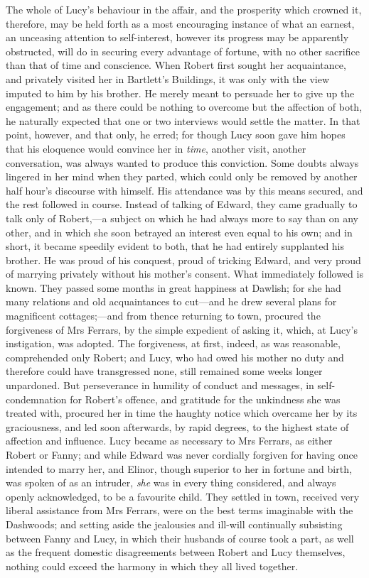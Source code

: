 The whole of Lucy's behaviour in the affair, and the prosperity which crowned it, therefore, may be held forth as a most encouraging instance of what an earnest, an unceasing attention to self-interest, however its progress may be apparently obstructed, will do in securing every advantage of fortune, with no other sacrifice than that of time and conscience. When Robert first sought her acquaintance, and privately visited her in Bartlett's Buildings, it was only with the view imputed to him by his brother. He merely meant to persuade her to give up the engagement; and as there could be nothing to overcome but the affection of both, he naturally expected that one or two interviews would settle the matter. In that point, however, and that only, he erred; for though Lucy soon gave him hopes that his eloquence would convince her in \textit{time}, another visit, another conversation, was always wanted to produce this conviction. Some doubts always lingered in her mind when they parted, which could only be removed by another half hour's discourse with himself. His attendance was by this means secured, and the rest followed in course. Instead of talking of Edward, they came gradually to talk only of Robert,—a subject on which he had always more to say than on any other, and in which she soon betrayed an interest even equal to his own; and in short, it became speedily evident to both, that he had entirely supplanted his brother. He was proud of his conquest, proud of tricking Edward, and very proud of marrying privately without his mother's consent. What immediately followed is known. They passed some months in great happiness at Dawlish; for she had many relations and old acquaintances to cut—and he drew several plans for magnificent cottages;—and from thence returning to town, procured the forgiveness of Mrs Ferrars, by the simple expedient of asking it, which, at Lucy's instigation, was adopted. The forgiveness, at first, indeed, as was reasonable, comprehended only Robert; and Lucy, who had owed his mother no duty and therefore could have transgressed none, still remained some weeks longer unpardoned. But perseverance in humility of conduct and messages, in self-condemnation for Robert's offence, and gratitude for the unkindness she was treated with, procured her in time the haughty notice which overcame her by its graciousness, and led soon afterwards, by rapid degrees, to the highest state of affection and influence. Lucy became as necessary to Mrs Ferrars, as either Robert or Fanny; and while Edward was never cordially forgiven for having once intended to marry her, and Elinor, though superior to her in fortune and birth, was spoken of as an intruder, \textit{she} was in every thing considered, and always openly acknowledged, to be a favourite child. They settled in town, received very liberal assistance from Mrs Ferrars, were on the best terms imaginable with the Dashwoods; and setting aside the jealousies and ill-will continually subsisting between Fanny and Lucy, in which their husbands of course took a part, as well as the frequent domestic disagreements between Robert and Lucy themselves, nothing could exceed the harmony in which they all lived together.

